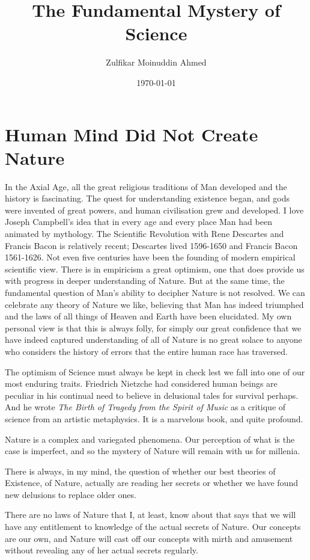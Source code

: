 \documentclass{amsart}
\title{The Fundamental Mystery of Science}
\author{Zulfikar Moinuddin Ahmed}
\date{\today}
\begin{document}
\maketitle

\section{Human Mind Did Not Create Nature}

In the Axial Age, all the great religious traditions of Man developed and the history is fascinating.  The quest for understanding existence began, and gods were invented of great powers, and human civilisation grew and developed.  I love Joseph Campbell's idea that in every age and every place Man had been animated by mythology.  The Scientific Revolution with Rene Descartes and Francis Bacon is relatively recent; Descartes lived 1596-1650 and Francis Bacon 1561-1626.  Not even five centuries have been the founding of modern empirical scientific view.  There is in empiricism a great optimism, one that does provide us with progress in deeper understanding of Nature.  But at the same time, the fundamental question of Man's ability to decipher Nature is not resolved.  We can celebrate any theory of Nature we like, believing that Man has indeed triumphed and the laws of all things of Heaven and Earth have been elucidated.  My own personal view is that this is always folly, for simply our great confidence that we have indeed captured understanding of all of Nature is no great solace to anyone who considers the history of errors that the entire human race has traversed.  

The optimism of Science must always be kept in check lest we fall into one of our most enduring traits.  Friedrich Nietzche had considered human beings are peculiar in his continual need to believe in delusional tales for survival perhaps.  And he wrote {\em The Birth of Tragedy from the Spirit of Music} as a critique of science from an artistic metaphysics.  It is a marvelous book, and quite profound.

Nature is a complex and variegated phenomena.  Our perception of what is the case is imperfect, and so the mystery of Nature will remain with us for millenia.  

There is always, in my mind, the question of whether our best theories of Existence, of Nature, actually are reading her secrets or whether we have found new delusions to replace older ones.  

There are no laws of Nature that I, at least, know about that says that we will have any entitlement to knowledge of the actual secrets of Nature.  Our concepts are our own, and Nature will cast off our concepts with mirth and amusement without revealing any of her actual secrets regularly.  
\end{document}
